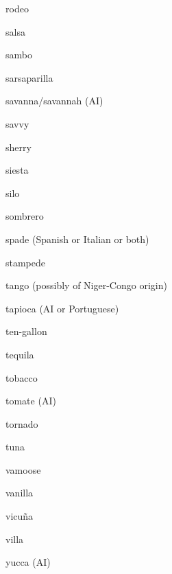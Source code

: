 rodeo

salsa

sambo

sarsaparilla

savanna/savannah (AI)

savvy

sherry

siesta

silo

sombrero

spade (Spanish or Italian or both)

stampede

tango (possibly of Niger-Congo origin)

tapioca (AI or Portuguese)

ten-gallon

tequila

tobacco

tomate (AI)

tornado

tuna

vamoose

vanilla

vicuña

villa

yucca (AI)

